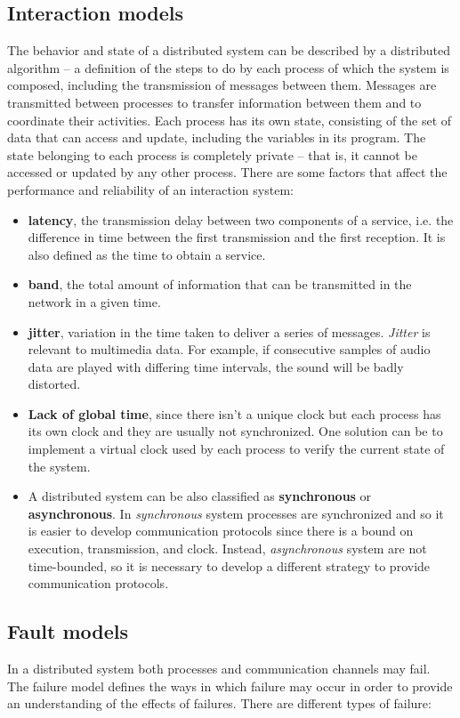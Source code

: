 \subsection{Interaction models}
The behavior and state of a distributed system can be described by a distributed algorithm – a definition of the steps to do by each process of which the system is composed, including the transmission of messages between them. Messages are transmitted between processes to transfer information between them and to coordinate their activities.
Each process has its own state, consisting of the set of data that can access and update, including the variables in its program. The state belonging to each process is completely private – that is, it cannot be accessed or updated by any other process.
There are some factors that affect the performance and reliability of an interaction system:
\begin{itemize}
    \item \textbf{latency}, the transmission delay between two components of a service, i.e. the difference in time between the first transmission and the first reception. It is also defined as the time to obtain a service.
    \item \textbf{band}, the total amount of information that can be transmitted in the network in a given time.
    \item \textbf{jitter}, variation in the time taken to deliver a series of messages. \textit{Jitter} is relevant to multimedia data. For example, if consecutive samples of audio data are played with differing time intervals, the sound will be badly distorted.
    \item \textbf{Lack of global time}, since there isn't a unique clock but each process has its own clock and they are usually not synchronized. One solution can be to implement a virtual clock used by each process to verify the current state of the system.
    \item A distributed system can be also classified as \textbf{synchronous} or \textbf{asynchronous}. In \textit{synchronous} system processes are synchronized and so it is easier to develop communication protocols since there is a bound on execution, transmission, and clock. Instead, \textit{asynchronous} system are not time-bounded, so it is necessary to develop a different strategy to provide communication protocols.
\end{itemize}

\subsection{Fault models}
In a distributed system both processes and communication channels may fail. The failure model defines the ways in which failure may occur in order to provide an understanding of the effects of failures.
There are different types of failure:

